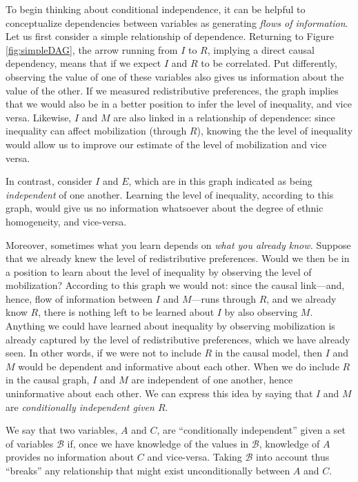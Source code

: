 \documentclass[
  12pt,
]{book}
\begin{document}
To begin thinking about conditional independence, it can be helpful to conceptualize dependencies between variables as generating \emph{flows of information}. Let us first consider a simple relationship of dependence. Returning to Figure \ref{fig:simpleDAG}, the arrow running from \(I\) to \(R\), implying a direct causal dependency, means that if we expect \(I\) and \(R\) to be correlated. Put differently, observing the value of one of these variables also gives us information about the value of the other. If we measured redistributive preferences, the graph implies that we would also be in a better position to infer the level of inequality, and vice versa. Likewise, \(I\) and \(M\) are also linked in a relationship of dependence: since inequality can affect mobilization (through \(R\)), knowing the the level of inequality would allow us to improve our estimate of the level of mobilization and vice versa.

In contrast, consider \(I\) and \(E\), which are in this graph indicated as being \emph{independent} of one another. Learning the level of inequality, according to this graph, would give us no information whatsoever about the degree of ethnic homogeneity, and vice-versa.

Moreover, sometimes what you learn depends on \emph{what you already know.} Suppose that we already knew the level of redistributive preferences. Would we then be in a position to learn about the level of inequality by observing the level of mobilization? According to this graph we would not: since the causal link---and, hence, flow of information between \(I\) and \(M\)---runs through \(R\), and we already know \(R\), there is nothing left to be learned about \(I\) by also observing \(M\). Anything we could have learned about inequality by observing mobilization is already captured by the level of redistributive preferences, which we have already seen. In other words, if we were not to include \(R\) in the causal model, then \(I\) and \(M\) would be dependent and informative about each other. When we do include \(R\) in the causal graph, \(I\) and \(M\) are independent of one another, hence uninformative about each other. We can express this idea by saying that \(I\) and \(M\) are \emph{conditionally independent given \(R\)}.

We say that two variables, \(A\) and \(C\), are ``conditionally independent'' given a set of variables \(\mathcal B\) if, once we have knowledge of the values in \(\mathcal B\), knowledge of \(A\) provides no information about \(C\) and vice-versa. Taking \(\mathcal B\) into account thus ``breaks'' any relationship that might exist unconditionally between \(A\) and \(C\).
\end{document}
